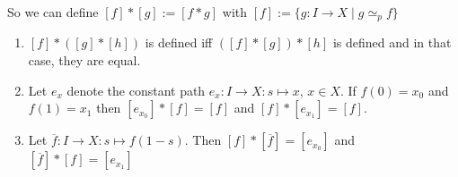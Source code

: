 So we can define $[f] * [g] := [f*g]$ with $[f] := \{g : I \to  X  \mid g \simeq_p f\} $

\begin{theorem}\leavevmode
    \begin{enumerate}
        \item $[f] * ([g] * [h])$  is defined iff $([f] * [g])*[h]$ is defined and in that case, they are equal.
        \item Let $e_x$ denote the constant path $e_x: I \to  X: s \mapsto x$, $x \in X$. If $f(0) = x_0$ and $f(1) = x_1$ then $[e_{x_0}] * [f] = [f]$ and $[f] * [e_{x_1}] = [f]$.
        \item Let $\overline{f} : I \to  X: s \mapsto  f(1-s)$. Then $[f] * [\overline{f}] = [e_{x_0}]$ and $[\overline{f}]*[f] = [e_{x_1}]$
    \end{enumerate}
\end{theorem}
